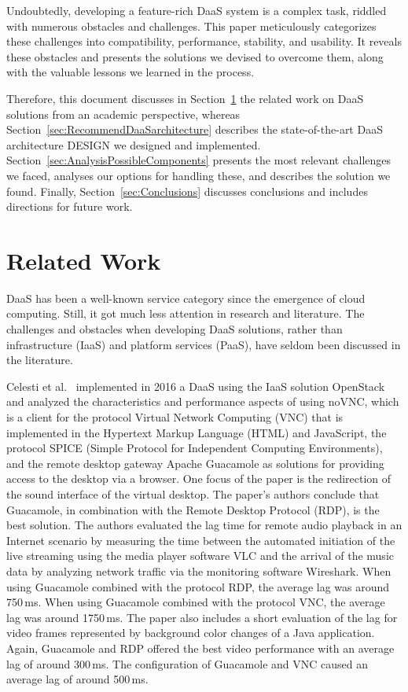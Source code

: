 \documentclass[runningheads]{llncs}
\begin{document}
Undoubtedly, developing a feature-rich DaaS system is a complex task, riddled with numerous obstacles and challenges. This paper meticulously categorizes these challenges into compatibility, performance, stability, and usability. It reveals these obstacles and presents the solutions we devised to overcome them, along with the valuable lessons we learned in the process.

Therefore, this document discusses in Section~\ref{sec:relatedworkAbschnitt}
the related work on DaaS solutions from an academic perspective,
whereas Section~\ref{sec:RecommendDaaSarchitecture}
describes the state-of-the-art DaaS architecture DESIGN we designed and implemented.
Section~\ref{sec:AnalysisPossibleComponents} presents the most relevant challenges we faced,
analyses our options for handling these,
and describes the solution we found.
Finally, Section~\ref{sec:Conclusions} discusses conclusions
and includes directions for future work.


\section{Related Work}\label{sec:relatedworkAbschnitt}


DaaS has been a well-known service category since the emergence of cloud computing.
Still, it got much less attention in research and literature.
The challenges and obstacles when developing DaaS solutions,
rather than infrastructure (IaaS) and platform services (PaaS),
have seldom been discussed in the literature.

Celesti et al.~\cite{celesti2016improving} implemented in 2016 a DaaS
using the IaaS solution OpenStack~\cite{sefraoui2012openstack}
and analyzed the characteristics and performance aspects of using noVNC,
which is a client for the protocol Virtual Network Computing (VNC)
that is implemented in the Hypertext Markup Language (HTML) and JavaScript,
the protocol SPICE (Simple Protocol for Independent Computing Environments),
and the remote desktop gateway Apache Guacamole as solutions
for providing access to the desktop via a browser.
One focus of the paper is the redirection
of the sound interface of the virtual desktop.
The paper's authors conclude that Guacamole,
in combination with the Remote Desktop Protocol (RDP), is the best solution.
The authors evaluated the lag time for remote audio playback
in an Internet scenario by measuring the time between the automated initiation
of the live streaming using the media player software VLC
and the arrival of the music data by analyzing network traffic
via the monitoring software Wireshark.
When using Guacamole combined with the protocol RDP,
the average lag was around 750\,ms.
When using Guacamole combined with the protocol VNC,
the average lag was around 1750\,ms.
The paper also includes a short evaluation of the lag for video frames
represented by background color changes of a Java application.
Again, Guacamole and RDP offered
the best video performance with an average lag of around 300\,ms.
The configuration of Guacamole and VNC caused an average lag of around 500\,ms.
\end{document}
